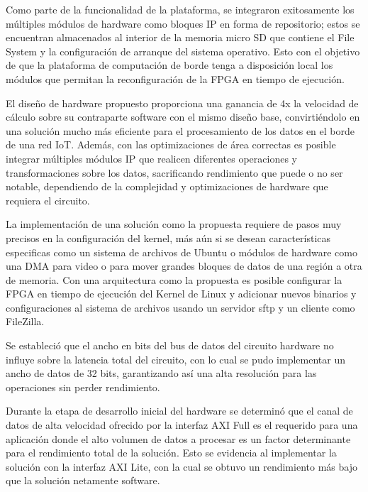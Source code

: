 Como parte de la funcionalidad de la plataforma, se integraron exitosamente los múltiples módulos de hardware como bloques IP en forma de repositorio; estos se encuentran almacenados al interior de la memoria micro SD que contiene el File System y la configuración de arranque del sistema operativo. Esto con el objetivo de que la plataforma de computación de borde tenga a disposición local los módulos que permitan la reconfiguración de la FPGA en tiempo de ejecución.

El diseño de hardware propuesto proporciona una ganancia de 4x la velocidad de cálculo sobre su contraparte software con el mismo diseño base, convirtiéndolo en una solución mucho más eficiente para el procesamiento de los datos en el borde de una red IoT. Además, con las optimizaciones de área correctas es posible integrar múltiples módulos IP que realicen diferentes operaciones y transformaciones sobre los datos, sacrificando rendimiento que puede o no ser notable, dependiendo de la complejidad y optimizaciones de hardware que requiera el circuito.

La implementación de una solución como la propuesta requiere de pasos muy precisos en la configuración del kernel, más aún si se desean características especificas como un sistema de archivos de Ubuntu o módulos de hardware como una DMA para video o para mover grandes bloques de datos de una región a otra de memoria. Con una arquitectura como la propuesta es posible configurar la FPGA en tiempo de ejecución del Kernel de Linux y adicionar nuevos binarios y configuraciones al sistema de archivos usando un servidor sftp y un cliente como FileZilla.

Se estableció que el ancho en bits del bus de datos del circuito hardware no influye sobre la latencia total del circuito, con lo cual se pudo implementar un ancho de datos de 32 bits, garantizando así una alta resolución para las operaciones sin perder rendimiento.

Durante la etapa de desarrollo inicial del hardware se determinó que el canal de datos de alta velocidad ofrecido por la interfaz AXI Full es el requerido para una aplicación donde el alto volumen de datos a procesar es un factor determinante para el rendimiento total de la solución. Esto se evidencia al implementar la solución con la interfaz AXI Lite, con la cual se obtuvo un rendimiento más bajo que la solución netamente software.